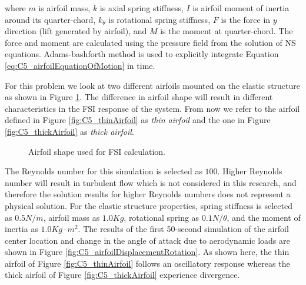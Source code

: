 %
where $m$ is airfoil mass, $k$ is axial spring stiffness, $I$ is airfoil moment of inertia around its quarter-chord, $k_\theta$ is rotational spring stiffness, $F$ is the force in $y$ direction (lift generated by airfoil), and $M$ is the moment at quarter-chord. The force and moment are calculated using the pressure field from the solution of NS equations. Adams-bashforth method is used to explicitly integrate Equation \eqref{eq:C5_airfoilEquationOfMotion} in time.

For this problem we look at two different airfoils mounted on the elastic structure as shown in Figure \ref{fig:C5_airfoilShape}. The difference in airfoil shape will result in different characteristics in the FSI response of the system. From now we refer to the airfoil defined in Figure \ref{fig:C5_thinAirfoil} as \emph{thin airfoil} and the one in Figure \ref{fig:C5_thickAirfoil} as \emph{thick airfoil}.
%
\begin{figure}[H]
    \centering
    \quad
    \caption{Airfoil shape used for FSI calculation.}
    \label{fig:C5_airfoilShape}
\end{figure}
%
The Reynolds number for this simulation is selected as $100$. Higher Reynolds number will result in turbulent flow which is not considered in this research, and therefore the solution results for higher Reynolds numbers does not represent a physical solution. For the elastic structure properties, spring stiffness is selected as $0.5 N/m$, airfoil mass as $1.0 Kg$, rotational spring as $0.1 N/\theta$, and the moment of inertia as $1.0 Kg \cdot m^2$. The results of the first 50-second simulation of the airfoil center location and change in the angle of attack due to aerodynamic loads are shown in Figure \ref{fig:C5_airfoilDisplacementRotation}. As shown here, the thin airfoil of Figure \ref{fig:C5_thinAirfoil} follows an oscillatory response whereas the thick airfoil of Figure \ref{fig:C5_thickAirfoil} experience divergence.
